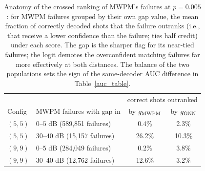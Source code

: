 \begin{table}
\centering
\begin{tabular}{ll|cc}
\toprule
 & & \multicolumn{2}{c}{correct shots outranked} \\
Config & MWPM failures with gap in & by $g_{\rm MWPM}$ & by $g_{\rm GNN}$ \\
\hline
\midrule
$(5, 5)$ & $0$--$5$ dB (589,851 failures) & 0.4\% & 2.3\% \\
$(5, 5)$ & $30$--$40$ dB (15,157 failures) & 26.2\% & 10.3\% \\
\hline
$(9, 9)$ & $0$--$5$ dB (284,049 failures) & 0.2\% & 3.8\% \\
$(9, 9)$ & $30$--$40$ dB (12,762 failures) & 12.6\% & 3.2\% \\
\bottomrule
\end{tabular}
\caption{Anatomy of the crossed ranking of MWPM's failures at $p = 0.005$: for MWPM failures grouped by their own gap value, the mean fraction of correctly decoded shots that the failure outranks (i.e., that receive a lower confidence than the failure; ties half credit) under each score. The gap is the sharper flag for its near-tied failures; the logit demotes the overconfident matching failures far more effectively at both distances. The balance of the two populations sets the sign of the same-decoder AUC difference in Table~\ref{auc_table}.}
\label{mechanism_table}
\end{table}
